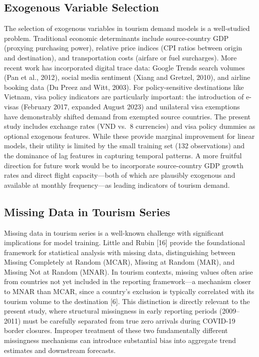 \documentclass[
]{article}
\begin{document}
\subsection{Exogenous Variable
Selection}\label{exogenous-variable-selection}

The selection of exogenous variables in tourism demand models is a
well-studied problem. Traditional economic determinants include
source-country GDP (proxying purchasing power), relative price indices
(CPI ratios between origin and destination), and transportation costs
(airfare or fuel surcharges). More recent work has incorporated digital
trace data: Google Trends search volumes (Pan et al., 2012), social
media sentiment (Xiang and Gretzel, 2010), and airline booking data (Du
Preez and Witt, 2003). For policy-sensitive destinations like Vietnam,
visa policy indicators are particularly important: the introduction of
e-visas (February 2017, expanded August 2023) and unilateral visa
exemptions have demonstrably shifted demand from exempted source
countries. The present study includes exchange rates (VND vs.~8
currencies) and visa policy dummies as optional exogenous features.
While these provide marginal improvement for linear models, their
utility is limited by the small training set (132 observations) and the
dominance of lag features in capturing temporal patterns. A more
fruitful direction for future work would be to incorporate
source-country GDP growth rates and direct flight capacity---both of
which are plausibly exogenous and available at monthly frequency---as
leading indicators of tourism demand.

\subsection{Missing Data in Tourism
Series}\label{missing-data-in-tourism-series}

Missing data in tourism series is a well-known challenge with
significant implications for model training. Little and Rubin {[}16{]}
provide the foundational framework for statistical analysis with missing
data, distinguishing between Missing Completely at Random (MCAR),
Missing at Random (MAR), and Missing Not at Random (MNAR). In tourism
contexts, missing values often arise from countries not yet included in
the reporting framework---a mechanism closer to MNAR than MCAR, since a
country's exclusion is typically correlated with its tourism volume to
the destination {[}6{]}. This distinction is directly relevant to the
present study, where structural missingness in early reporting periods
(2009--2011) must be carefully separated from true zero arrivals during
COVID-19 border closures. Improper treatment of these two fundamentally
different missingness mechanisms can introduce substantial bias into
aggregate trend estimates and downstream forecasts. \newpage
\end{document}
